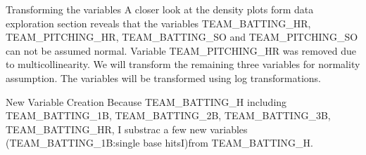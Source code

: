\documentclass[]{article}
\newenvironment{Shaded}{\begin{snugshade}}{\end{snugshade}}
\newcommand{\KeywordTok}[1]{\textcolor[rgb]{0.13,0.29,0.53}{\textbf{#1}}}
\newcommand{\DataTypeTok}[1]{\textcolor[rgb]{0.13,0.29,0.53}{#1}}
\newcommand{\DecValTok}[1]{\textcolor[rgb]{0.00,0.00,0.81}{#1}}
\newcommand{\StringTok}[1]{\textcolor[rgb]{0.31,0.60,0.02}{#1}}
\newcommand{\OperatorTok}[1]{\textcolor[rgb]{0.81,0.36,0.00}{\textbf{#1}}}
\newcommand{\NormalTok}[1]{#1}
\begin{document}
Transforming the variables A closer look at the density plots form data
exploration section reveals that the variables TEAM\_BATTING\_HR,
TEAM\_PITCHING\_HR, TEAM\_BATTING\_SO and TEAM\_PITCHING\_SO can not be
assumed normal. Variable TEAM\_PITCHING\_HR was removed due to
multicollinearity. We will transform the remaining three variables for
normality assumption. The variables will be transformed using log
transformations.

\begin{Shaded}
\end{Shaded}

New Variable Creation Because TEAM\_BATTING\_H including
TEAM\_BATTING\_1B, TEAM\_BATTING\_2B, TEAM\_BATTING\_3B,
TEAM\_BATTING\_HR, I substrac a few new variables
(TEAM\_BATTING\_1B:single base hitsI)from TEAM\_BATTING\_H.

\begin{Shaded}
\end{Shaded}
\end{document}
